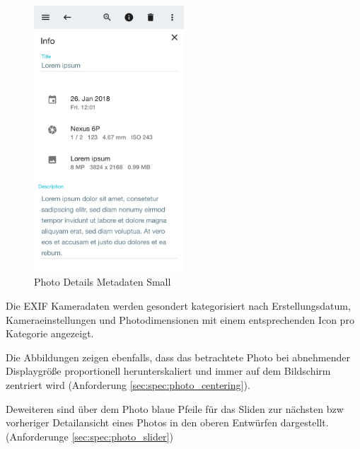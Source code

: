 \begin{figure}[htp]     %
\centering
\includegraphics[width=0.5\textwidth]{images/form_small} 
\caption{Photo Details Metadaten Small}\label{fig:form_small}
\end{figure}

Die EXIF Kameradaten werden gesondert kategorisiert nach Erstellungsdatum, Kameraeinstellungen und Photodimensionen mit einem entsprechenden Icon pro Kategorie angezeigt.

Die Abbildungen zeigen ebenfalls, dass das betrachtete Photo bei abnehmender Displaygröße proportionell herunterskaliert und immer auf dem Bildschirm zentriert wird (Anforderung \ref{sec:spec:photo_centering}).

Deweiteren sind über dem Photo blaue Pfeile für das Sliden zur nächsten bzw vorheriger Detailansicht eines Photos in den oberen Entwürfen dargestellt. 
(Anforderunge \ref{sec:spec:photo_slider})